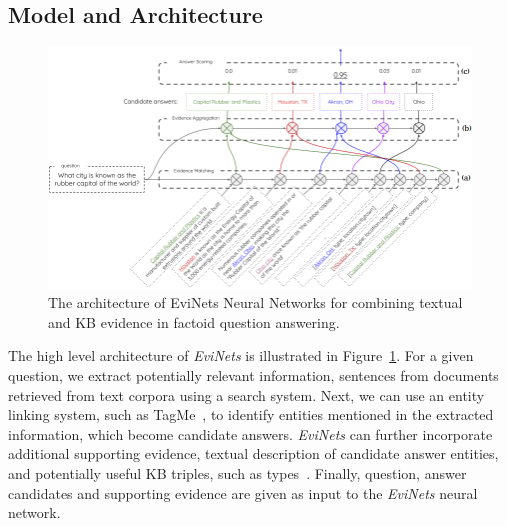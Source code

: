 \subsection{Model and Architecture}
\label{section:factoid:evinets:model}

\begin{figure}[t]
\centering
\includegraphics[width=\textwidth]{img/EviNet}
\caption{The architecture of EviNets Neural Networks for combining textual and KB evidence in factoid question answering.}
\label{figure:factoid:evinet:model}
\end{figure}

The high level architecture of \textit{EviNets} is illustrated in Figure~\ref{figure:factoid:evinet:model}.
For a given question, we extract potentially relevant information, \eg sentences from documents retrieved from text corpora using a search system.
Next, we can use an entity linking system, such as TagMe~\cite{ferragina2010tagme}, to identify entities mentioned in the extracted information, which become candidate answers.
\textit{EviNets} can further incorporate additional supporting evidence, \eg textual description of candidate answer entities, and potentially useful KB triples, such as types~\cite{Sun:2015:ODQ:2736277.2741651}.
Finally, question, answer candidates and supporting evidence are given as input to the \textit{EviNets} neural network.

